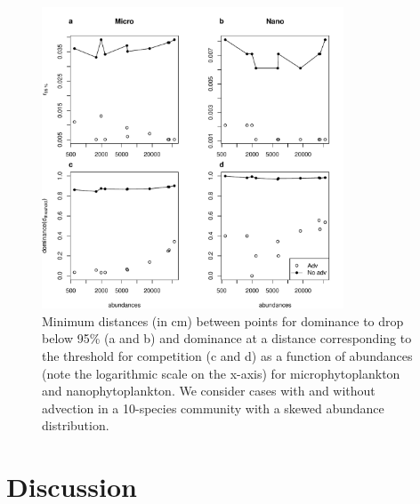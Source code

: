 \documentclass[english]{article}
\begin{document}
\begin{figure}[H]
\begin{centering}
\includegraphics[width=0.8\textwidth]{../code/figure/carac_10species}
\par\end{centering}
\caption{Minimum distances (in cm) between points for dominance to drop below
95\% (a and b) and dominance at a distance corresponding to the threshold
for competition (c and d) as a function of abundances (note the logarithmic
scale on the x-axis) for microphytoplankton and nanophytoplankton.
We consider cases with and without advection in a 10-species community
with a skewed abundance distribution. \label{fig:Carac_10sp}}
\end{figure}


\section*{Discussion}
\end{document}
